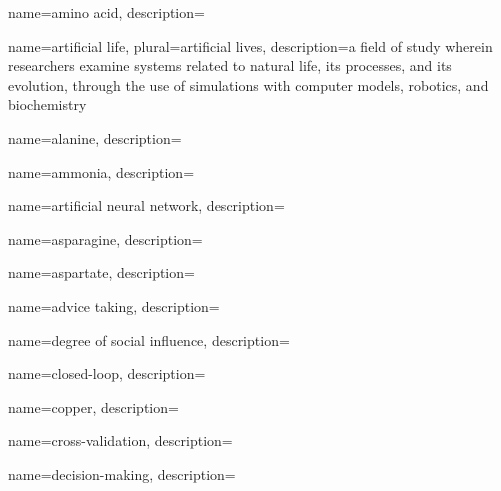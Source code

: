 


	{
		name={amino acid},
		description={}
	}


	{
		name={artificial life},
		plural={artificial lives},
		description={a field of study wherein researchers examine systems related to natural life, its processes, and its evolution, through the use of simulations with computer models, robotics, and biochemistry}
	}
	
	{
		name={alanine},
		description={}
	}	
	
	{
		name={ammonia},
		description={}
	}	
	
	{
		name={artificial neural network},
		description={}
	}		
	
	{
		name={asparagine},
		description={}
	}

	{
		name={aspartate},
		description={}
	}		

	{
		name={advice taking},
		description={}
	}	


	{
		name={degree of social influence},
		description={}
	}


	{
		name={closed-loop},
		description={}
	}	

	{
		name={copper},
		description={}
	}

	{
		name={cross-validation},
		description={}
	}		
	

	{
		name={decision-making},
		description={}
	}

